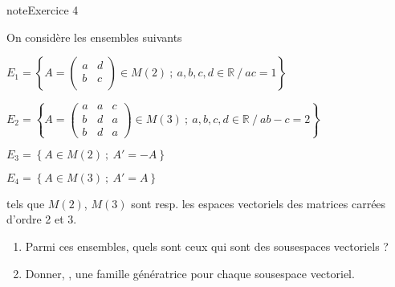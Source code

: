 \documentclass[letterpaper,10pt,french]{jupyterBook}
\begin{document}
\begin{sphinxadmonition}{note}{Exercice 4}

\sphinxAtStartPar
On considère les ensembles suivants

\sphinxAtStartPar
\( 
E_1 = \left\{  A = \begin{pmatrix}
a& d\\
b&c \\
\end{pmatrix} \in M(2) ~;~ 
a,b,c, d \in \mathbb{R} ~/~ ac = 1\right\}
\)

\sphinxAtStartPar
\( 
E_2 = \left\{  A = \begin{pmatrix}
a& a & c\\
b& d & a\\
b& d & a
\end{pmatrix} \in M(3) ~;~
a,b,c, d \in \mathbb{R} ~/~ ab-c = 2\right\}
\)

\sphinxAtStartPar
\( 
E_3 = \left\{  A \in M(2) ~;~
A' = -A \right\}
\)

\sphinxAtStartPar
\( 
E_4 = \left\{  A \in M(3) ~;~
A' = A \right\}
\)

\sphinxAtStartPar
tels que \(M(2)\), \(M(3)\) sont resp. les espaces vectoriels des matrices carrées d’ordre 2 et 3.
\begin{enumerate}
%
\item {} 
\sphinxAtStartPar
Parmi ces ensembles, quels sont ceux qui sont des sous\sphinxhyphen{}espaces vectoriels ?

\item {} 
\sphinxAtStartPar
Donner, , une famille génératrice pour chaque sous\sphinxhyphen{}espace vectoriel.

\end{enumerate}
\end{sphinxadmonition}
\end{document}
